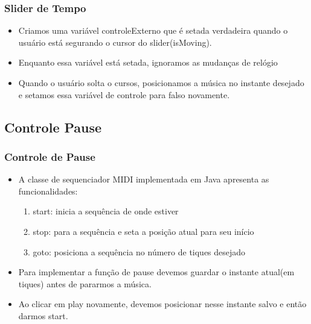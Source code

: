 \documentclass{beamer}
\begin{document}
\begin{frame}
  \frametitle{Slider de Tempo}
  \begin{itemize}
   \item Criamos uma variável controleExterno que é setada verdadeira quando o usuário está segurando
   o cursor do slider(isMoving). 
   \item Enquanto essa variável está setada, ignoramos as mudanças de relógio
   \item Quando o usuário solta o cursos, posicionamos a música no instante desejado e 
   setamos essa variável de controle para falso novamente.
  \end{itemize}
\end{frame}

\subsection{Controle Pause}
\begin{frame}
  \frametitle{Controle de Pause}
  \begin{itemize}
   \item A classe de sequenciador MIDI implementada em Java apresenta as funcionalidades:
    \begin{enumerate}
     \item start: inicia a sequência de onde estiver
     \item stop: para a sequência e seta a posição atual para seu início
     \item goto: posiciona a sequência no número de tiques desejado
    \end{enumerate}
    \item Para implementar a função de pause devemos guardar o instante atual(em tiques)
    antes de pararmos a música.
    \item Ao clicar em play novamente, devemos posicionar nesse instante salvo e então
    darmos start.
  \end{itemize}
\end{frame}
\end{document}
